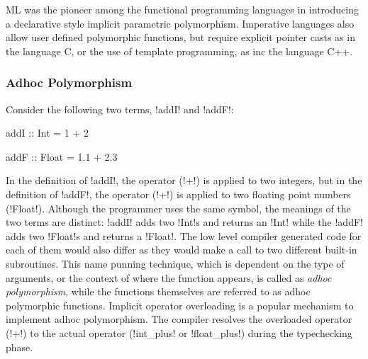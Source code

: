 \documentclass[screen,nonacm]{acmart}
\begin{document}
ML\cite{milner_logic_1975,milner_theory_1978}
was the pioneer among the functional programming languages in
introducing a declarative style implicit parametric polymorphism.
Imperative languages also allow user defined
polymorphic functions, but require explicit pointer casts as in the
language C, or the use of template programming, as inc the language C++.

\subsubsection{Adhoc Polymorphism}
Consider the following two terms, !addI! and !addF!:

\begin{minipage}[ht]{0.5\linewidth}
\begin{CenteredBox}
\begin{code}
addI :: Int = 1 + 2
\end{code}
\end{CenteredBox}
\end{minipage}%
\begin{minipage}[ht]{0.5\linewidth}
\begin{CenteredBox}
\begin{code}
addF :: Float = 1.1 + 2.3
\end{code}
\end{CenteredBox}
\end{minipage}

In the definition of !addI!, the operator (!+!) is applied to two
integers, but in the definition of !addF!, the operator (!+!) is
applied to two floating point numbers (!Float!). Although the
programmer uses the same symbol, the meanings of the two terms are
distinct: !addI! adds two !Int!s and returns an !Int! while the !addF!
adds two !Float!s and returns a !Float!. The low level compiler generated code
for each of them would also differ as they would make a call to two
different built-in subroutines. This name punning technique, which is dependent on the
type of arguments, or the context of where the function appears, is called as \emph{adhoc
polymorphism}\cite{strachey_fundamental_2000}, while the functions
themselves are referred to as adhoc polymorphic functions. Implicit
operator overloading is a popular mechanism to implement adhoc
polymorphism. The compiler resolves the overloaded operator (!+!) to
the actual operator (!int_plus! or !float_plus!) during the typechecking phase.
\end{document}
